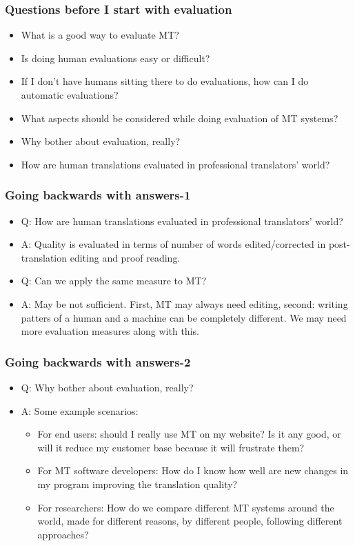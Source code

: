 \documentclass{beamer}
\begin{document}
\begin{frame}
\frametitle{Questions before I start with evaluation}
\begin{itemize}
\item What is a good way to evaluate MT? \pause
\item Is doing human evaluations easy or difficult?
\item If I don't have humans sitting there to do evaluations, how can I do automatic evaluations? \pause
\item What aspects should be considered while doing evaluation of MT systems? \pause
\item Why bother about evaluation, really? \pause
\item How are human translations evaluated in professional translators' world? \pause
\end{itemize}
\end{frame}

\begin{frame}
\frametitle{Going backwards with answers-1}
\begin{itemize}
\item Q: How are human translations evaluated in professional translators' world?
\item A: Quality is evaluated in terms of number of words edited/corrected in post-translation editing and proof reading.
\item Q: Can we apply the same measure to MT? \pause
\item A: May be not sufficient. First, MT may always need editing, second: writing patters of a human and a machine can be completely different. We may need more evaluation measures along with this.
\end{itemize}
\end{frame}

\begin{frame}
\frametitle{Going backwards with answers-2}
\begin{itemize}
\item Q: Why bother about evaluation, really?
\item A: Some example scenarios: 
\begin{itemize}
\item For end users: should I really use MT on my website? Is it any good, or will it reduce my customer base because it will frustrate them? \pause
\item For MT software developers: How do I know how well are new changes in my program improving the translation quality? \pause
\item For researchers: How do we compare different MT systems around the world, made for different reasons, by different people, following different approaches? \pause
\end{itemize}
\end{itemize}
\end{frame}
\end{document}
